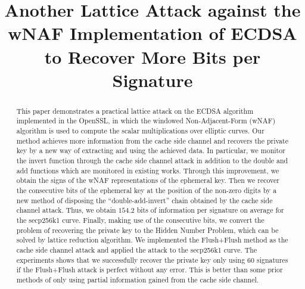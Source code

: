 \documentclass[runningheads]{llncs}
\begin{document}
%
\title{Another Lattice Attack against the wNAF Implementation of ECDSA to Recover More Bits per Signature}
%
%
\maketitle              %
%
\begin{abstract}
This paper demonstrates a practical lattice attack on the ECDSA algorithm implemented in the OpenSSL, in which the windowed Non-Adjacent-Form (wNAF) algorithm is used to compute the scalar multiplications over elliptic curves.
Our method achieves more information from the cache side channel and
    recovers the private key by a new way of extracting and using the achieved data.
In particular, we monitor the invert function through the cache side channel attack
    in addition to the double and add functions which are monitored in existing works.
 Through this improvement, we obtain the signs of the wNAF representations of the ephemeral key.
Then we recover the consecutive bits of the ephemeral key at the position of the non-zero digits by a new method of disposing the ``double-add-invert'' chain obtained by the cache side channel attack.
Thus, we obtain $154.2$ bits of information per signature on average for the secp256k1 curve.
Finally, making use of the consecutive bits,
 we convert the problem of recovering the private key to the Hidden Number Problem,
 which can be solved by lattice reduction algorithm.
We implemented the Flush+Flush method as the cache side channel attack and applied the attack to the secp256k1 curve.
The experiments shows that we successfully recover the private key only using $60$ signatures if the Flush+Flush attack is perfect without any error.
This is better than some prior methods of only using partial information gained from the cache side channel.

\end{abstract}
%
%
%
\end{document}
